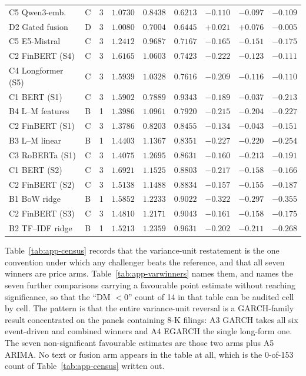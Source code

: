 \begin{table}[p]
\begin{tabular}{@{}llrrrrrrr@{}}
C5 Qwen3-emb. & C & 3 & $1.0730$ & $0.8438$ & $0.6213$ & $-0.110$ & $-0.097$ & $-0.109$ \\
D2 Gated fusion & D & 3 & $1.0080$ & $0.7004$ & $0.6445$ & $+0.021$ & $+0.076$ & $-0.005$ \\
C5 E5-Mistral & C & 3 & $1.2412$ & $0.9687$ & $0.7167$ & $-0.165$ & $-0.151$ & $-0.175$ \\
C2 FinBERT (S4) & C & 3 & $1.6165$ & $1.0603$ & $0.7423$ & $-0.222$ & $-0.123$ & $-0.111$ \\
C4 Longformer (S5) & C & 3 & $1.5939$ & $1.0328$ & $0.7616$ & $-0.209$ & $-0.116$ & $-0.110$ \\
C1 BERT (S1) & C & 3 & $1.5902$ & $0.7889$ & $0.9343$ & $-0.189$ & $-0.037$ & $-0.213$ \\
B4 L--M features & B & 1 & $1.3986$ & $1.0961$ & $0.7920$ & $-0.215$ & $-0.204$ & $-0.227$ \\
C2 FinBERT (S1) & C & 3 & $1.3786$ & $0.8203$ & $0.8455$ & $-0.134$ & $-0.043$ & $-0.151$ \\
B3 L--M linear & B & 1 & $1.4403$ & $1.1367$ & $0.8351$ & $-0.227$ & $-0.220$ & $-0.254$ \\
C3 RoBERTa (S1) & C & 3 & $1.4075$ & $1.2695$ & $0.8631$ & $-0.160$ & $-0.213$ & $-0.191$ \\
C1 BERT (S2) & C & 3 & $1.6921$ & $1.1525$ & $0.8803$ & $-0.217$ & $-0.158$ & $-0.166$ \\
C2 FinBERT (S2) & C & 3 & $1.5138$ & $1.1488$ & $0.8834$ & $-0.157$ & $-0.155$ & $-0.187$ \\
B1 BoW ridge & B & 1 & $1.5852$ & $1.2233$ & $0.9022$ & $-0.322$ & $-0.297$ & $-0.355$ \\
C2 FinBERT (S3) & C & 3 & $1.4810$ & $1.2171$ & $0.9043$ & $-0.161$ & $-0.158$ & $-0.175$ \\
B2 TF--IDF ridge & B & 1 & $1.5213$ & $1.2359$ & $0.9631$ & $-0.202$ & $-0.211$ & $-0.268$ \\
\bottomrule
\end{tabular}
\end{table}

Table~\ref{tab:app-census} records that the variance-unit restatement is
the one convention under which any challenger beats the reference, and that
all seven winners are price arms. Table~\ref{tab:app-varwinners} names
them, and names the seven further comparisons carrying a favourable point
estimate without reaching significance, so that the ``DM $<0$'' count of 14
in that table can be audited cell by cell. The pattern is that the entire
variance-unit reversal is a GARCH-family result concentrated on the panels
containing 8-K filings: A3 GARCH takes all six event-driven and combined
winners and A4 EGARCH the single long-form one. The seven
non-significant favourable estimates are those two arms plus A5 ARIMA. No
text or fusion arm appears in the table at all, which is the 0-of-153 count
of Table~\ref{tab:app-census} written out.

